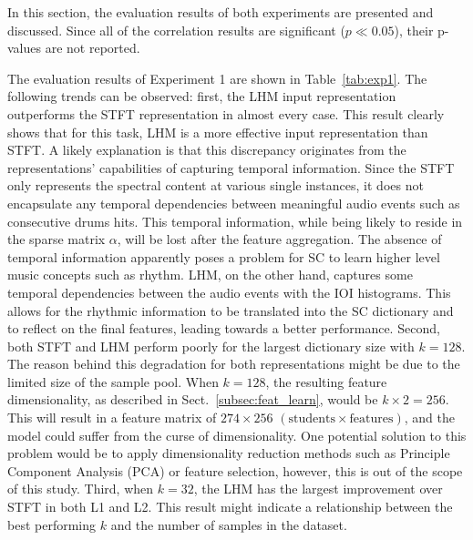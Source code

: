 \documentclass[conference]{IEEEtran}
\begin{document}
In this section, the evaluation results of both experiments are presented and discussed. Since all of the correlation results are significant ($p\ll 0.05$), their p-values are not reported.  

The evaluation results of Experiment 1 are shown in Table~\ref{tab:exp1}. The following trends can be observed: first, the LHM input representation outperforms the STFT representation in almost every case. This result clearly shows that for this task, LHM is a more effective input representation than STFT. A likely explanation is that this discrepancy originates from the representations' capabilities of capturing temporal information. Since the STFT only represents the spectral content at various single instances, it does not encapsulate any temporal dependencies between meaningful audio events such as consecutive drums hits. This temporal information, while being likely to reside in the sparse matrix $\alpha$, will be lost after the feature aggregation. The absence of temporal information apparently poses a problem for SC to learn higher level music concepts such as rhythm. LHM, on the other hand, captures some temporal dependencies between the audio events with the IOI histograms. This allows for the rhythmic information to be translated into the SC dictionary and to reflect on the final features, leading towards a better performance. 
Second, both STFT and LHM perform poorly for the largest dictionary size with $k = 128$. The reason behind this degradation for both representations might be due to the limited size of the sample pool. When $k = 128$, the resulting feature dimensionality, as described in Sect.~\ref{subsec:feat_learn}, would be $k \times 2 = 256$. This will result in a feature matrix of $274 \times 256$ $(\text{students} \times \text{features})$, and the model could suffer from the curse of dimensionality. One potential solution to this problem would be to apply dimensionality reduction methods such as Principle Component Analysis (PCA) or feature selection, however, this is out of the scope of this study. 
Third, when $k = 32$, the LHM has the largest improvement over STFT in both L1 and L2. This result might indicate a relationship between the best performing $k$ and the number of samples in the dataset.
\end{document}
